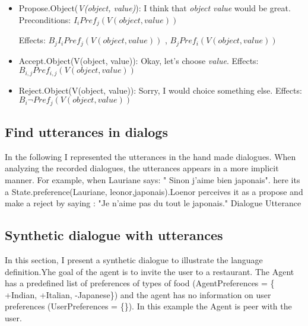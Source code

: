 \documentclass{llncs}
\begin{document}
\begin{itemize}
  \item Propose.Object(\textit{V(object, value)}): I think that \textit{object value} would be great.
  \subitem Preconditions:  $ I_{i} Pref_{j}(V(object, value))$
  
  \subitem Effects:  $B_{j} I_{i} Pref_{j}(V(object, value))$ ,  $ B_{j} Pref_{i}(V(object, value))$  
  \item Accept.Object(V(object, value)): Okay, let's choose \textit{value}.
     \subitem Effects:  $B_{i,j} Pref_{i,j}(V(object, value))$ 
  
  \item Reject.Object(V(object, value)): Sorry, I would choice something else.
      \subitem Effects:  $B_{i} \neg  Pref_{j}(V(object, value))$
 \end{itemize} 
 \subsection{Find utterances in dialogs}	
 
 In the following I represented the utterances in the hand made dialogues. When analyzing the recorded dialogues, the utterances appears in a more implicit manner. For example, when Lauriane says: " Sinon j'aime bien japonais". here its a State.preference(Lauriane, leonor,japonais).Loenor perceives it as a propose and make a reject by saying : "Je n'aime pas du tout le japonais."
 Dialogue	Utterance

 \subsection{Synthetic dialogue with utterances}
 In this section, I present a synthetic dialogue to illustrate the language definition.Yhe goal of the agent is to invite the user to a restaurant. The Agent has a predefined list of preferences of types of food (AgentPreferences = \{ +Indian, +Italian, -Japanese\}) and the agent has no information on user preferences (UserPreferences = \{\}). In this example the Agent is peer with the user. 


\begin{minipage}{0.45\textwidth}
 
\end{minipage}%
\hfill
\begin{minipage}{0.45\textwidth}

\end{minipage}%


\noindent 
\vskip 4pt


\end{document}
